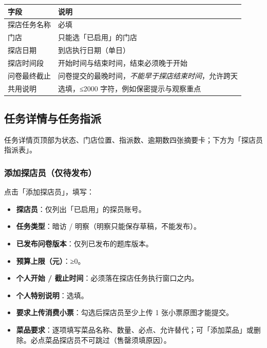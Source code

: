 \documentclass[12pt,a4paper,fontset=none]{ctexart}
\begin{document}
\begin{center}
\begin{tabular}{p{3.6cm}p{9.6cm}}
\toprule
字段 & 说明 \\
\midrule
探店任务名称 & 必填 \\
门店 & 只能选「已启用」的门店 \\
探店日期 & 到店执行日期（单日） \\
探店时间段 & 开始时间与结束时间，结束必须晚于开始 \\
问卷最终截止 & 问卷提交的最晚时间，\emph{不能早于探店结束时间}，允许跨天 \\
共用说明 & 选填，≤2000 字符，例如保密提示与观察重点 \\
\bottomrule
\end{tabular}
\end{center}


\subsection{任务详情与任务指派}
任务详情页顶部为状态、门店位置、指派数、逾期数四张摘要卡；下方为「探店员指派表」。

\subsubsection{添加探店员（仅待发布）}
点击「添加探店员」，填写：

\begin{itemize}
\item \textbf{探店员}：仅列出「已启用」的探员账号。
\item \textbf{任务类型}：暗访 / 明察（明察只能保存草稿，不能发布）。
\item \textbf{已发布问卷版本}：仅列已发布的题库版本。
\item \textbf{预算上限（元）}：≥0。
\item \textbf{个人开始 / 截止时间}：必须落在探店任务执行窗口之内。
\item \textbf{个人特别说明}：选填。
\item \textbf{要求上传消费小票}：勾选后探店员至少上传 1 张小票原图才能提交。
\item \textbf{菜品要求}：逐项填写菜品名称、数量、必点、允许替代；可「添加菜品」或删除。必点菜品探店员不可跳过（售罄须填原因）。
\end{itemize}
\end{document}
